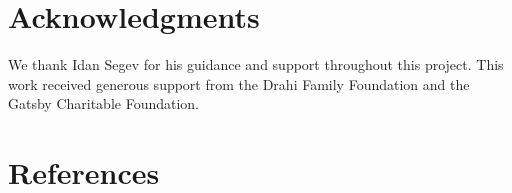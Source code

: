 \documentclass[
  11pt,
  a4paper,
]{article}
\begin{document}
\section*{Acknowledgments}\label{acknowledgments}

We thank Idan Segev for his guidance and support throughout this
project. This work received generous support from the Drahi Family
Foundation and the Gatsby Charitable Foundation.

\section*{References}\label{references}

\begingroup\raggedright{}
\end{document}
